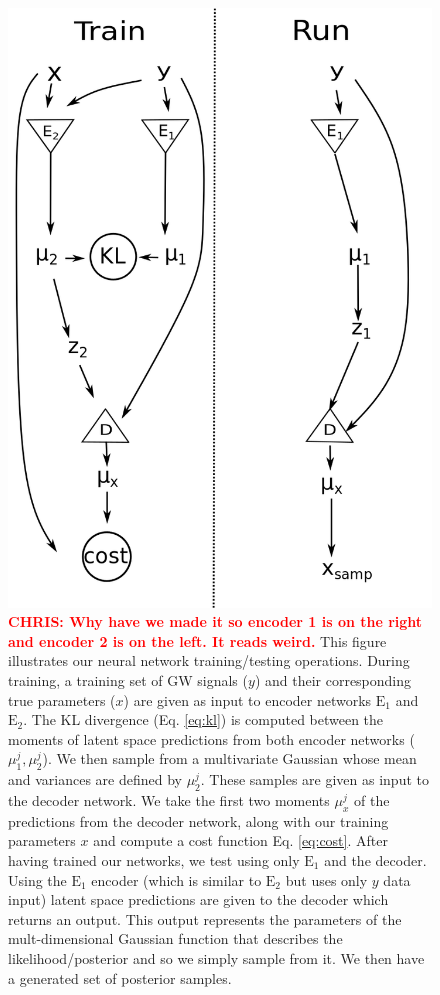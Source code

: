 \documentclass[%
showpacs,
 amsmath,amssymb,
 aps,
 twocolumn,
 prl,
 reprint,
floatfix,
]{revtex4-1}
\newcommand{\chris}[1]{\textbf{\textcolor{red}{CHRIS: #1}}}
\begin{document}
\begin{figure}
    \includegraphics[width=\columnwidth]{images/network_setup.png}
    \caption{\label{fig:network_config}\chris{Why have we made it so encoder 1 is on the right and encoder 2
is on the left. It reads weird.} This figure illustrates our neural network
training/testing operations. During training, a training set of GW signals
($y$) and their corresponding true parameters ($x$) are given as input to
encoder networks $\textrm{E}_1$ and $\textrm{E}_2$. The KL divergence (Eq.
\ref{eq:kl}) is computed between the moments of latent space predictions from both
encoder networks ($\mu^{j}_{1},\mu^{j}_{2}$). We then sample from a multivariate Gaussian whose mean and variances are defined by $\mu^{j}_{2}$. These samples are given as input to the decoder network. We take the first two moments $\mu^{j}_x$ of the predictions 
from the decoder network, along with our training parameters $x$ and compute a cost function Eq. \ref{eq:cost}. After having trained our networks, we
test using only $\textrm{E}_1$ and the decoder. Using the $\textrm{E}_1$ encoder (which is similar to $\textrm{E}_2$ but uses only $y$ data input) latent space 
predictions are given to the decoder which returns an output. This output represents the parameters of the mult-dimensional Gaussian function
that describes the likelihood/posterior and so we simply sample from it. We 
then have a generated set of posterior samples.} 
\end{figure}
\end{document}
